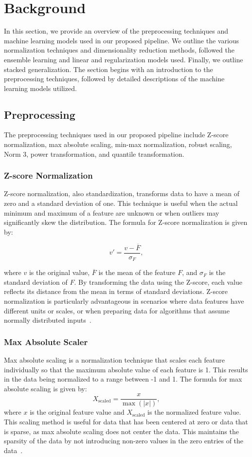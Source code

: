 \section{Background}\label{sec:background}
In this section, we provide an overview of the preprocessing techniques and machine learning models used in our proposed pipeline.
We outline the various normalization techniques and dimensionality reduction methods, followed the ensemble learning and linear and regularization models used.
Finally, we outline stacked generalization.
The section begins with an introduction to the preprocessing techniques, followed by detailed descriptions of the machine learning models utilized.

\subsection{Preprocessing}
The preprocessing techniques used in our proposed pipeline include Z-score normalization, max absolute scaling, min-max normalization, robust scaling, Norm 3, power transformation, and quantile transformation.

\subsubsection{Z-score Normalization}
Z-score normalization, also standardization, transforms data to have a mean of zero and a standard deviation of one.
This technique is useful when the actual minimum and maximum of a feature are unknown or when outliers may significantly skew the distribution.
The formula for Z-score normalization is given by:

$$
v' = \frac{v - \overline{F}}{\sigma_F},
$$

where $v$ is the original value, $\overline{F}$ is the mean of the feature $F$, and $\sigma_F$ is the standard deviation of $F$.
By transforming the data using the Z-score, each value reflects its distance from the mean in terms of standard deviations.
Z-score normalization is particularly advantageous in scenarios where data features have different units or scales, or when preparing data for algorithms that assume normally distributed inputs~\cite{dataminingConcepts}.

\subsubsection{Max Absolute Scaler}
Max absolute scaling is a normalization technique that scales each feature individually so that the maximum absolute value of each feature is 1.
This results in the data being normalized to a range between -1 and 1.
The formula for max absolute scaling is given by:
$$
	X_{\text{scaled}} = \frac{x}{\max(|x|)},
$$
where $x$ is the original feature value and $X_{\text{scaled}}$ is the normalized feature value.
This scaling method is useful for data that has been centered at zero or data that is sparse, as max absolute scaling does not center the data.
This maintains the sparsity of the data by not introducing non-zero values in the zero entries of the data~\cite{Vasques2024}.

